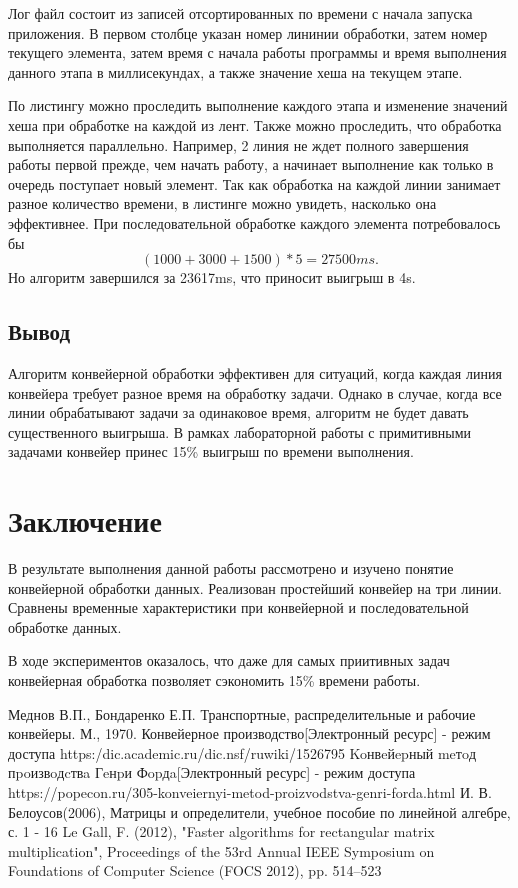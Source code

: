 \documentclass[a4paper,12pt]{report}
\begin{document}
			Лог файл состоит из записей отсортированных по времени с начала запуска приложения. 
			В первом столбце указан номер лининии обработки, затем номер текущего элемента, затем время с начала работы программы и время выполнения данного этапа в миллисекундах, а также значение хеша на текущем этапе.
			
			По листингу можно проследить выполнение каждого этапа  и изменение значений хеша при обработке на каждой из лент. 
			Также можно проследить, что обработка выполняется параллельно. 
			Например, 2 линия не ждет полного завершения работы первой прежде, чем начать работу, а начинает выполнение как только в очередь поступает новый элемент. 
			Так как обработка на каждой линии занимает разное количество времени, в листинге можно увидеть, насколько она эффективнее.
			При последовательной обработке каждого элемента потребовалось бы $$(1000 + 3000 + 1500) * 5 = 27500ms.$$ 
			Но алгоритм завершился за 23617ms, что приносит выигрыш в 4s.
        
    \section{Вывод}

        Алгоритм конвейерной обработки эффективен для ситуаций, когда каждая линия конвейера требует разное время на обработку задачи. 
        Однако в случае, когда  все линии обрабатывают задачи за одинаковое время, алгоритм не будет давать существенного выигрыша. 
        В рамках лабораторной работы с примитивными задачами конвейер принес 15\% выигрыш по времени выполнения.

    \newpage

    \chapter*{Заключение}
        \label{sec:conclusion_part}
        
        В результате выполнения данной работы рассмотрено и изучено понятие конвейерной обработки данных. 
        Реализован простейший конвейер на три линии. Сравнены временные характеристики при конвейерной и последовательной обработке данных. 
        
        В ходе экспериментов оказалось, что даже для самых приитивных задач конвейерная обработка позволяет сэкономить 15\% времени работы.
        
     \begin{thebibliography}{3}
    	 Меднов В.П., Бондаренко Е.П. Транспортные, распределительные и рабочие конвейеры. М., 1970.
    	 Конвейерное производство[Электронный ресурс] - режим доступа https:/dic.academic.ru/dic.nsf/ruwiki/1526795
    	 Koнвeйepный meтoд пpoизвoдcтвa Гeнpи Фopдa[Электронный ресурс] - режим доступа https://popecon.ru/305-konveiernyi-metod-proizvodstva-genri-forda.html
    	 И. В. Белоусов(2006), Матрицы и определители, учебное пособие по линейной алгебре, с. 1 - 16
    	Le Gall, F. (2012), "Faster algorithms for rectangular matrix multiplication", Proceedings of the 53rd Annual IEEE Symposium on Foundations of Computer Science (FOCS 2012), pp. 514–523
    \end{thebibliography}
\end{document}

